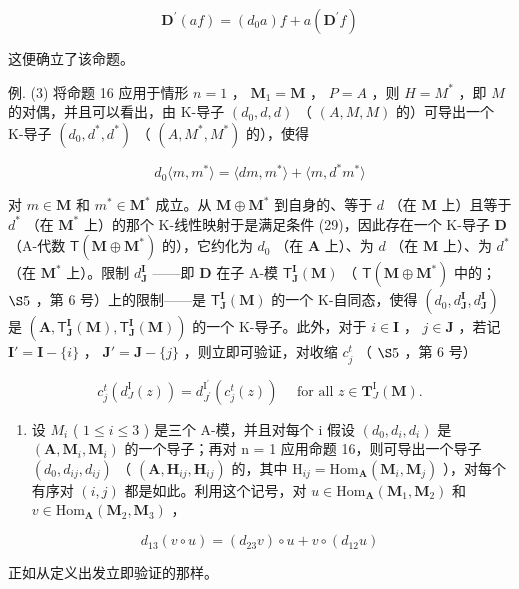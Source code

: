 \[
\mathbf {D} ^ {\prime} (a f) = \left(d _ {0} a\right) f + a (\mathbf {D} ^ {\prime} f)
\]

这便确立了该命题。

例. (3) 将命题 16 应用于情形 \(n = 1\) ， \(\mathbf{M}_1 = \mathbf{M}\) ， \(P = A\) ，则 \(H = M^*\) ，即 \(M\) 的对偶，并且可以看出，由 K-导子 \((d_0, d, d)\) （ \((A, M, M)\) 的）可导出一个 K-导子 \((d_0, d^*, d^*)\) （ \((A, M^*, M^*)\) 的），使得

\[
d _ {0} \langle m, m ^ {*} \rangle = \langle d m, m ^ {*} \rangle + \langle m, d ^ {*} m ^ {*} \rangle\tag{38}
\]

对 \(m \in \mathbf{M}\) 和 \(m^* \in \mathbf{M}^*\) 成立。从 \(\mathbf{M} \oplus \mathbf{M}^*\) 到自身的、等于 \(d\) （在 \(\mathbf{M}\) 上）且等于 \(d^{*}\) （在 \(\mathbf{M}^{*}\) 上）的那个 K-线性映射于是满足条件 (29)，因此存在一个 K-导子 \(\mathbf{D}\) （A-代数 \(\mathsf{T}(\mathbf{M} \oplus \mathbf{M}^{*})\) 的），它约化为 \(d_{0}\) （在 \(\mathbf{A}\) 上）、为 \(d\) （在 \(\mathbf{M}\) 上）、为 \(d^{*}\) （在 \(\mathbf{M}^{*}\) 上）。限制 \(d_{\mathbf{J}}^{\mathbf{I}}\) ——即 \(\mathbf{D}\) 在子 A-模 \(\mathsf{T}_{\mathbf{J}}^{\mathbf{I}}(\mathbf{M})\) （ \(\mathsf{T}(\mathbf{M} \oplus \mathbf{M}^{*})\) 中的； \(\S 5\) ，第 6 号）上的限制——是 \(\mathsf{T}_{\mathbf{J}}^{\mathbf{I}}(\mathbf{M})\) 的一个 K-自同态，使得 \((d_{0}, d_{\mathbf{J}}^{\mathbf{I}}, d_{\mathbf{J}}^{\mathbf{I}})\) 是 \((\mathbf{A}, \mathsf{T}_{\mathbf{J}}^{\mathbf{I}}(\mathbf{M}), \mathsf{T}_{\mathbf{J}}^{\mathbf{I}}(\mathbf{M}))\) 的一个 K-导子。此外，对于 \(i \in \mathbf{I}\) ， \(j \in \mathbf{J}\) ，若记 \(\mathbf{I}' = \mathbf{I} - \{i\}\) ， \(\mathbf{J}' = \mathbf{J} - \{j\}\) ，则立即可验证，对收缩 \(c_{j}^{t}\) （ \(\S 5\) ，第 6 号）

\[
c _ {j} ^ {t} (d _ {J} ^ {\mathrm{I}} (z)) = d _ {J ^ {\prime}} ^ {\mathrm{I} ^ {\prime}} (c _ {j} ^ {t} (z)) \quad \text { for   all } z \in \mathbf {T} _ {J} ^ {\mathrm{I}} (\mathbf {M}).
\]

\begin{enumerate}
\def\labelenumi{(\arabic{enumi})}
\setcounter{enumi}{3}
\tightlist
\item
  设 \(M_{i}\) ( \(1 \leqslant i \leqslant 3\) ) 是三个 A-模，并且对每个 i 假设 \((d_{0}, d_{i}, d_{i})\) 是 \((\mathbf{A}, \mathbf{M}_{i}, \mathbf{M}_{i})\) 的一个导子；再对 n = 1 应用命题 16，则可导出一个导子 \((d_{0}, d_{ij}, d_{ij})\) （ \((\mathbf{A}, \mathbf{H}_{ij}, \mathbf{H}_{ij})\) 的，其中 \(\mathrm{H}_{ij} = \mathrm{Hom}_{\mathbf{A}}(\mathbf{M}_{i}, \mathbf{M}_{j})\) ），对每个有序对 \((i, j)\) 都是如此。利用这个记号，对 \(u \in \mathrm{Hom}_{\mathbf{A}}(\mathbf{M}_{1}, \mathbf{M}_{2})\) 和 \(v \in \mathrm{Hom}_{\mathbf{A}}(\mathbf{M}_{2}, \mathbf{M}_{3})\) ，
\end{enumerate}

\[
d _ {1 3} (v \circ u) = (d _ {2 3} v) \circ u + v \circ (d _ {1 2} u)\tag{39}
\]

正如从定义出发立即验证的那样。

